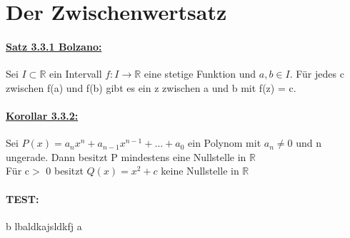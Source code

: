 \documentclass[8pt]{extreport}
\begin{document}
\section{Der Zwischenwertsatz}
\paragraph{\underline{Satz 3.3.1 Bolzano:}} Sei $I \subset \mathbb{R}$ ein Intervall $f:I \rightarrow \mathbb{R}$ eine stetige Funktion und $a,b \in I$. Für jedes c zwischen f(a) und f(b) gibt es ein z zwischen a und b mit f(z) = c.
\paragraph{\underline{Korollar 3.3.2:}} Sei $P(x) = a_nx^n + a_{n-1}x^{n-1} + \dots + a_0$ ein Polynom mit $a_n \neq 0$ und n ungerade. Dann besitzt P mindestens eine Nullstelle in $\mathbb{R}$\\
Für c$>$ 0 besitzt $Q(x) = x^2 + c$ keine Nullstelle in $\mathbb{R}$

\paragraph{TEST:}b lbaldkajsldkfj a
\end{document}
